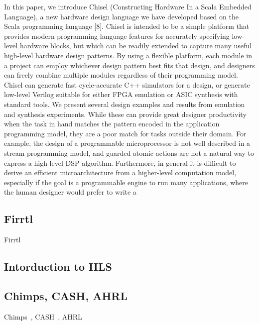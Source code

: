 In this paper, we introduce Chisel (Constructing Hardware In a Scala Embedded Language), a new hardware design language we have developed based on the Scala programming language [8]. Chisel is intended to be a simple
platform that provides modern programming language features for accurately specifying low-level hardware blocks,
but which can be readily extended to capture many useful high-level hardware design patterns. By using a flexible
platform, each module in a project can employ whichever
design pattern best fits that design, and designers can freely
combine multiple modules regardless of their programming
model. Chisel can generate fast cycle-accurate C++ simulators for a design, or generate low-level Verilog suitable for
either FPGA emulation or ASIC synthesis with standard
tools. We present several design examples and results from
emulation and synthesis experiments.
While these can provide great designer productivity when
the task in hand matches the pattern encoded in the application programming model, they are a poor match for tasks
outside their domain. For example, the design of a programmable microprocessor is not well described in a stream
programming model, and guarded atomic actions are not a
natural way to express a high-level DSP algorithm. Furthermore, in general it is difficult to derive an efficient microarchitecture from a higher-level computation model, especially
if the goal is a programmable engine to run many applications, where the human designer would prefer to write a

\subsection{Firrtl}
Firrtl~\cite{izraelevitz_2017_firrtl_reusability, li_2016_firrtl_specification}



\subsection{Intorduction to HLS}
\cite{gajski_1994_introduction}

\subsection{Chimps, CASH, AHRL}

Chimps~\cite{chimps}, CASH~\cite{budiu_pegasus_2002,budiu_cash_2002}, AHRL~\cite{ahrl}
%

